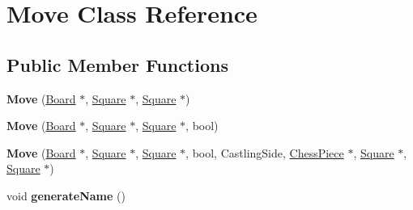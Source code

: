 \hypertarget{class_move}{}\section{Move Class Reference}
\label{class_move}
\subsection*{Public Member Functions}
\begin{DoxyCompactItemize}
\item 
\mbox{\label{class_move_a38c4990ac28b0cdfae9050409ab7415a}} 
{\bfseries Move} (\mbox{\hyperlink{class_board}{Board}} $\ast$, \mbox{\hyperlink{class_square}{Square}} $\ast$, \mbox{\hyperlink{class_square}{Square}} $\ast$)
\item 
\mbox{\label{class_move_acefd7884211b1f7a7d2b8ba4ddcf1ba9}} 
{\bfseries Move} (\mbox{\hyperlink{class_board}{Board}} $\ast$, \mbox{\hyperlink{class_square}{Square}} $\ast$, \mbox{\hyperlink{class_square}{Square}} $\ast$, bool)
\item 
\mbox{\label{class_move_a904562de252b165c26c1f139d259c8eb}} 
{\bfseries Move} (\mbox{\hyperlink{class_board}{Board}} $\ast$, \mbox{\hyperlink{class_square}{Square}} $\ast$, \mbox{\hyperlink{class_square}{Square}} $\ast$, bool, Castling\+Side, \mbox{\hyperlink{class_chess_piece}{Chess\+Piece}} $\ast$, \mbox{\hyperlink{class_square}{Square}} $\ast$, \mbox{\hyperlink{class_square}{Square}} $\ast$)
\item 
\mbox{\label{class_move_a9d91dd03207b55a7016a5f8de36f698a}} 
void {\bfseries generate\+Name} ()
\end{DoxyCompactItemize}
